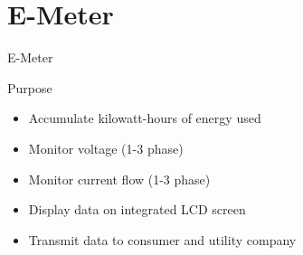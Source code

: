 \documentclass{beamer}
\begin{document}
\section{E-Meter}
\begin{frame}{E-Meter}
	\begin{block}{Purpose}
		\begin{itemize}
		\item <1-> Accumulate kilowatt-hours of energy used
		\item <2-> Monitor voltage (1-3 phase)
		\item <3-> Monitor current flow (1-3 phase)
		\item <4-> Display data on integrated LCD screen
		\item <5-> Transmit data to consumer and utility company
		\end{itemize}
	\end{block}
\end{frame}
\end{document}
